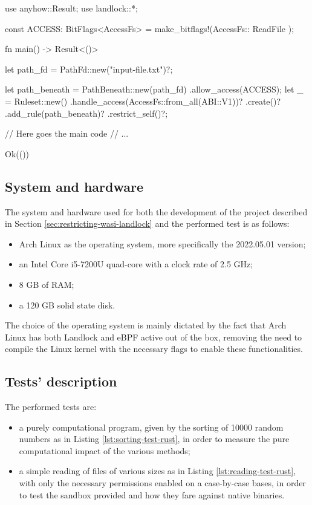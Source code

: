 \vspace*{0.5cm}
\begin{code}[language=Rust, caption=An example of a program restricted with Landlock., label=lst:test-program-landlock-example]
use anyhow::Result;
use landlock::*;

const ACCESS: BitFlags<AccessFs> =
  make_bitflags!(AccessFs::{ ReadFile });

fn main() -> Result<()> {
    let path_fd = PathFd::new("input-file.txt")?;
    
    let path_beneath = PathBeneath::new(path_fd)
      .allow_access(ACCESS);
    let _ = Ruleset::new()
        .handle_access(AccessFs::from_all(ABI::V1))?
        .create()?
        .add_rule(path_beneath)?
        .restrict_self()?;

    // Here goes the main code
    // ...

    Ok(())
}
\end{code}

\clearpage
\subsection{System and hardware}

The system and hardware used for both the development of the project described in Section \ref{sec:restricting-wasi-landlock}
and the performed test is as follows:
\begin{itemize}
  \item Arch Linux \cite{arch-linux} as the operating system, more specifically the 2022.05.01 version;
  \item an Intel Core i5-7200U quad-core with a clock rate of 2.5 GHz;
  \item 8 GB of RAM;
  \item a 120 GB solid state disk.
\end{itemize}

The choice of the operating system is mainly dictated by the fact that Arch Linux has both Landlock and eBPF active
out of the box, removing the need to compile the Linux kernel with the necessary flags to enable these
functionalities.

\subsection{Tests' description}

The performed tests are:
\begin{itemize}
  \item a purely computational program, given by the sorting of 10000 random numbers as in Listing \ref{lst:sorting-test-rust},
        in order to measure the pure computational impact of the various methods;
  \item a simple reading of files of various sizes as in Listing \ref{lst:reading-test-rust}, with only the necessary permissions enabled on
        a case-by-case bases, in order to test the sandbox provided and how they fare against native binaries.
\end{itemize}

